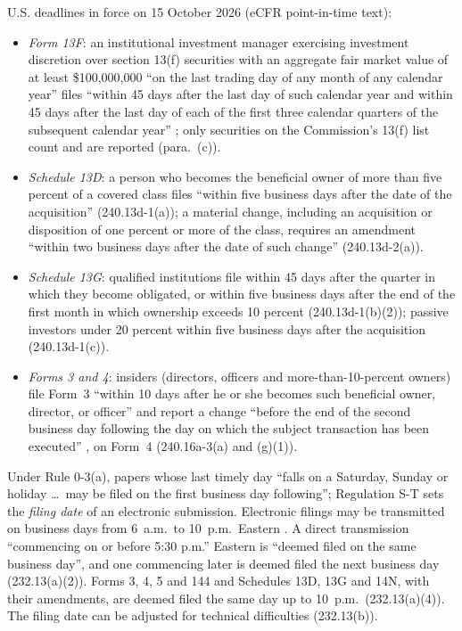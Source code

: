 \begin{qfdata}\label{data:holdings-insider-filing-lags}
 U.S. deadlines in force on 15 October 2026 (eCFR point-in-time text):
\begin{itemize}
\item \emph{Form 13F}: an institutional investment manager exercising investment discretion over section 13(f) securities with an aggregate fair market value of at least \$100{,}000{,}000 ``on the last trading day of any month of any calendar year'' files ``within 45 days after the last day of such calendar year and within 45 days after the last day of each of the first three calendar quarters of the subsequent calendar year'' \citep[17 CFR 240.13f-1(a)(1)]{ecfr-17cfr240-filing-rules}; only securities on the Commission's 13(f) list count and are reported (para.~(c)).
\item \emph{Schedule 13D}: a person who becomes the beneficial owner of more than five percent of a covered class files ``within five business days after the date of the acquisition'' (240.13d-1(a)); a material change, including an acquisition or disposition of one percent or more of the class, requires an amendment ``within two business days after the date of such change'' (240.13d-2(a)).
\item \emph{Schedule 13G}: qualified institutions file within 45 days after the quarter in which they become obligated, or within five business days after the end of the first month in which ownership exceeds 10 percent (240.13d-1(b)(2)); passive investors under 20 percent within five business days after the acquisition (240.13d-1(c)).
\item \emph{Forms 3 and 4}: insiders (directors, officers and more-than-10-percent owners) file Form~3 ``within 10 days after he or she becomes such beneficial owner, director, or officer'' and report a change ``before the end of the second business day following the day on which the subject transaction has been executed'' \citep[15 U.S.C. 78p(a)(2)(B)--(C), 2023 edition]{usc-15-78p}, on Form~4 (240.16a-3(a) and (g)(1)).
\end{itemize}
Under Rule 0-3(a), papers whose last timely day ``falls on a Saturday, Sunday or holiday \dots\ may be filed on the first business day following''; Regulation S-T sets the \emph{filing date} of an electronic submission. Electronic filings may be transmitted on business days from 6~a.m.\ to 10~p.m.\ Eastern \citep[17 CFR 232.12(c)]{ecfr-17cfr232-filing-date}. A direct transmission ``commencing on or before 5:30 p.m.'' Eastern is ``deemed filed on the same business day'', and one commencing later is deemed filed the next business day (232.13(a)(2)). Forms 3, 4, 5 and 144 and Schedules 13D, 13G and 14N, with their amendments, are deemed filed the same day up to 10~p.m.\ (232.13(a)(4)). The filing date can be adjusted for technical difficulties (232.13(b)).


\end{qfdata}
